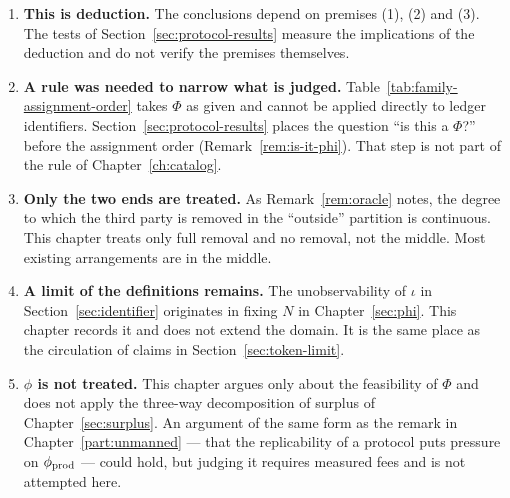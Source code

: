 \begin{enumerate}[label=(\arabic*)]
\item \textbf{This is deduction.} The conclusions depend on premises (1), (2) and (3).
The tests of Section~\ref{sec:protocol-results} measure the implications of the deduction and
do not verify the premises themselves.

\item \textbf{A rule was needed to narrow what is judged.}
Table~\ref{tab:family-assignment-order} takes $\Phi$ as given and cannot be applied directly
to ledger identifiers. Section~\ref{sec:protocol-results} places the question ``is this a
$\Phi$?'' before the assignment order (Remark~\ref{rem:is-it-phi}). That step is not part of
the rule of Chapter~\ref{ch:catalog}.

\item \textbf{Only the two ends are treated.} As Remark~\ref{rem:oracle} notes, the degree to
which the third party is removed in the ``outside'' partition is continuous. This chapter
treats only full removal and no removal, not the middle. Most existing arrangements are in
the middle.

\item \textbf{A limit of the definitions remains.} The unobservability of $\iota$ in
Section~\ref{sec:identifier} originates in fixing $N$ in Chapter~\ref{sec:phi}. This chapter
records it and does not extend the domain. It is the same place as the circulation of claims
in Section~\ref{sec:token-limit}.

\item \textbf{$\phi$ is not treated.} This chapter argues only about the feasibility of
$\Phi$ and does not apply the three-way decomposition of surplus of
Chapter~\ref{sec:surplus}. An argument of the same form as the remark in
Chapter~\ref{part:unmanned} --- that the replicability of a protocol puts pressure on
$\phi_{\rm prod}$ --- could hold, but judging it requires measured fees and is not attempted
here.
\end{enumerate}

